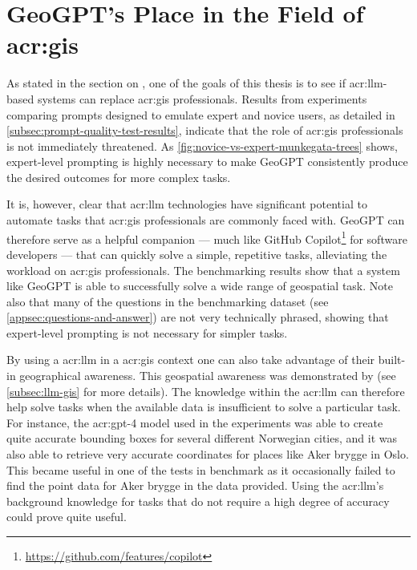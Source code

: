 \section[GeoGPT's Place in the Field of GIS]{GeoGPT's Place in the Field of \acrshort{acr:gis}}
\label{sec:geogpt-in-gis}

As stated in the section on , one of the goals of this thesis is to see if \acrshort{acr:llm}-based systems can replace \acrshort{acr:gis} professionals. Results from experiments comparing prompts designed to emulate expert and novice users, as detailed in \autoref{subsec:prompt-quality-test-results}, indicate that the role of \acrshort{acr:gis} professionals is not immediately threatened. As \autoref{fig:novice-vs-expert-munkegata-trees} shows, expert-level prompting is highly necessary to make GeoGPT consistently produce the desired outcomes for more complex tasks.

It is, however, clear that \acrshort{acr:llm} technologies have significant potential to automate tasks that \acrshort{acr:gis} professionals are commonly faced with. GeoGPT can therefore serve as a helpful companion --- much like GitHub Copilot\footnote{\url{https://github.com/features/copilot}} for software developers --- that can quickly solve a simple, repetitive tasks, alleviating the workload on \acrshort{acr:gis} professionals. The benchmarking results show that a system like GeoGPT is able to successfully solve a wide range of geospatial task. Note also that many of the questions in the benchmarking dataset (see \autoref{appsec:questions-and-answer}) are not very technically phrased, showing that expert-level prompting is not necessary for simpler tasks.

By using a \acrlong{acr:llm} in a \acrshort{acr:gis} context one can also take advantage of their built-in geographical awareness. This geospatial awareness was demonstrated by \cite{robertsGPT4GEOHowLanguage2023} (see \autoref{subsec:llm-gis} for more details). The knowledge within the \acrshort{acr:llm} can therefore help solve tasks when the available data is insufficient to solve a particular task. For instance, the \acrshort{acr:gpt}-4 model used in the experiments was able to create quite accurate bounding boxes for several different Norwegian cities, and it was also able to retrieve very accurate coordinates for places like Aker brygge in Oslo. This became useful in one of the tests in benchmark as it occasionally failed to find the point data for Aker brygge in the data provided. Using the \acrshort{acr:llm}'s background knowledge for tasks that do not require a high degree of accuracy could prove quite useful.


